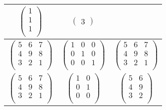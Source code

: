 \begin{table}[h!]
\begin{tabular}{||c c c||}
        $\begin{pmatrix}
            1\\
            1\\
            1\\
        \end{pmatrix}$
        &
        $\begin{pmatrix}
            3
        \end{pmatrix}$ \\
        \hline
        $\begin{pmatrix}
            5 & 6 & 7\\
            4 & 9 & 8\\
            3 & 2 & 1\\
        \end{pmatrix}$ 
        &  
        $\begin{pmatrix}
            1 & 0 & 0\\
            0 & 1 & 0\\
            0 & 0 & 1\\
        \end{pmatrix}$
        &
        $\begin{pmatrix}
            5 & 6 & 7\\
            4 & 9 & 8\\
            3 & 2 & 1\\
        \end{pmatrix}$ \\
        \hline
        $\begin{pmatrix}
            5 & 6 & 7\\
            4 & 9 & 8\\
            3 & 2 & 1\\
        \end{pmatrix}$ 
        &  
        $\begin{pmatrix}
            1 & 0\\
            0 & 1\\
            0 & 0\\
        \end{pmatrix}$
        &
        $\begin{pmatrix}
            5 & 6\\
            4 & 9\\
            3 & 2\\
        \end{pmatrix}$ \\
        \hline
        \end{tabular}
\end{table}

